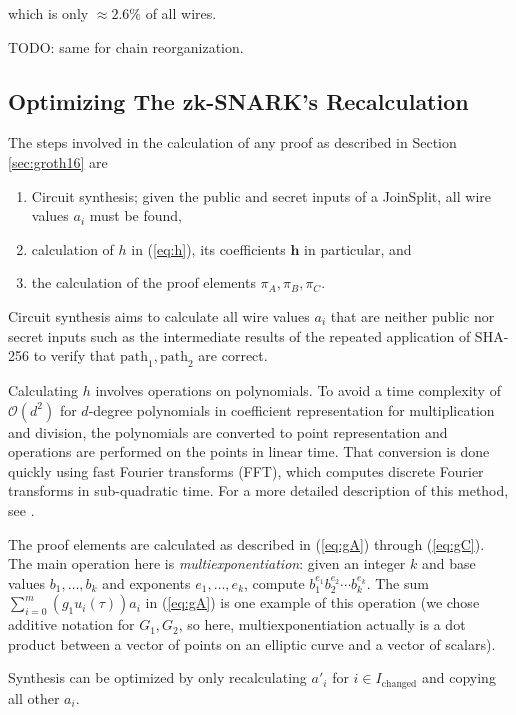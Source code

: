 \documentclass{article}
\begin{document}
which is only $\approx 2.6\%$ of all wires.

TODO: same for chain reorganization.

\subsection{Optimizing The zk-SNARK's Recalculation} \label{sec:opt}

The steps involved in the calculation of any proof as described in Section \ref{sec:groth16} are

\begin{enumerate}
        \item Circuit synthesis; given the public and secret inputs of a JoinSplit, all wire values $a_i$ must be found, 
        \item calculation of $h$ in (\ref{eq:h}), its coefficients $\boldsymbol{h}$ in particular, and
        \item the calculation of the proof elements $\pi_A, \pi_B, \pi_C$.
\end{enumerate}

Circuit synthesis aims to calculate all wire values $a_i$ that are neither public nor secret inputs such as the intermediate results of the repeated application of SHA-256 to verify that $\text{path}_1, \text{path}_2$ are correct.

Calculating $h$ involves operations on polynomials.
To avoid a time complexity of $\mathcal{O}(d^2)$ for $d$-degree polynomials in coefficient representation for multiplication and division, the polynomials are converted to point representation and operations are performed on the points in linear time.
That conversion is done quickly using fast Fourier transforms (FFT), which computes discrete Fourier transforms in sub-quadratic time.
For a more detailed description of this method, see \cite{cormen:clrs}.

The proof elements are calculated as described in (\ref{eq:gA}) through (\ref{eq:gC}).
The main operation here is \textit{multiexponentiation}: given an integer $k$ and base values $b_1, \ldots, b_k$ and exponents $e_1, \ldots, e_k$, compute $b_1^{e_1}b_2^{e_2}\cdots b_k^{e_k}$.
The sum $\sum_{i=0}^m {(g_1{u_i(\tau)})}{a_i}$ in (\ref{eq:gA}) is one example of this operation (we chose additive notation for $G_1, G_2$, so here, multiexponentiation actually is a dot product between a vector of points on an elliptic curve and a vector of scalars).

Synthesis can be optimized by only recalculating $a'_i$ for $i \in I_\text{changed}$ and copying all other $a_i$.
\end{document}

